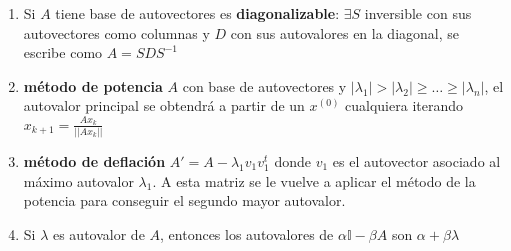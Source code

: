 \documentclass[10pt]{article}
\begin{document}
\begin{enumerate}
    \item Si $A$ tiene base de autovectores es \textbf{diagonalizable}: $\exists S$ inversible con sus autovectores como columnas  y $D$ con sus autovalores en la diagonal, se escribe como $A = SDS^{-1}$
    \item \textbf{método de potencia} $A$ con base de autovectores y $|\lambda_1| > |\lambda_2| \geq \dots \geq |\lambda_n|$, el autovalor principal se obtendrá a partir de un $x^{(0)}$ cualquiera iterando $x_{k+1} = \frac{Ax_k}{||Ax_k||}$
    \item \textbf{método de deflación} $A' = A - \lambda_1 v_1 v_1^t$ donde $v_1$ es el autovector asociado al máximo autovalor $\lambda_1$. A esta matriz se le vuelve a aplicar el método de la potencia para conseguir el segundo mayor autovalor.
    \item Si $\lambda$ es autovalor de $A$, entonces los autovalores de $\alpha\mathbb{I}-\beta A$ son $\alpha+\beta \lambda$ 
\end{enumerate}
\end{document}
